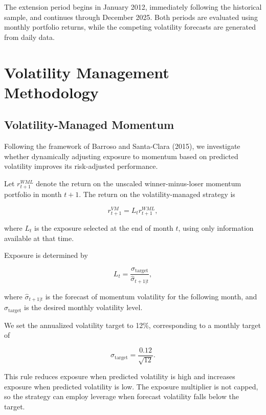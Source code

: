 \documentclass[11pt]{article}
\begin{document}
The extension period begins in January 2012, immediately
following the historical sample, and continues through
December 2025. Both periods are evaluated using monthly
portfolio returns, while the competing volatility forecasts
are generated from daily data.


\section{Volatility Management Methodology}
\label{sec:methodology}

\subsection{Volatility-Managed Momentum}

Following the framework of Barroso and Santa-Clara (2015),
we investigate whether dynamically adjusting exposure to
momentum based on predicted volatility improves its
risk-adjusted performance.

Let $r_{t+1}^{WML}$ denote the return on the unscaled
winner-minus-loser momentum portfolio in month $t+1$.
The return on the volatility-managed strategy is

\begin{equation}
r_{t+1}^{VM}
=
L_t r_{t+1}^{WML},
\label{eq:managed_return}
\end{equation}

where $L_t$ is the exposure selected at the end of month
$t$, using only information available at that time.

Exposure is determined by

\begin{equation}
L_t
=
\frac{\sigma_{\mathrm{target}}}
{\widehat{\sigma}_{t+1|t}},
\label{eq:vol_target}
\end{equation}

where $\widehat{\sigma}_{t+1|t}$ is the forecast of
momentum volatility for the following month, and
$\sigma_{\mathrm{target}}$ is the desired monthly
volatility level.

We set the annualized volatility target to 12\%,
corresponding to a monthly target of

\begin{equation}
\sigma_{\mathrm{target}}
=
\frac{0.12}{\sqrt{12}}.
\end{equation}

This rule reduces exposure when predicted volatility
is high and increases exposure when predicted volatility
is low. The exposure multiplier is not capped, so
the strategy can employ leverage when forecast
volatility falls below the target.
\end{document}
